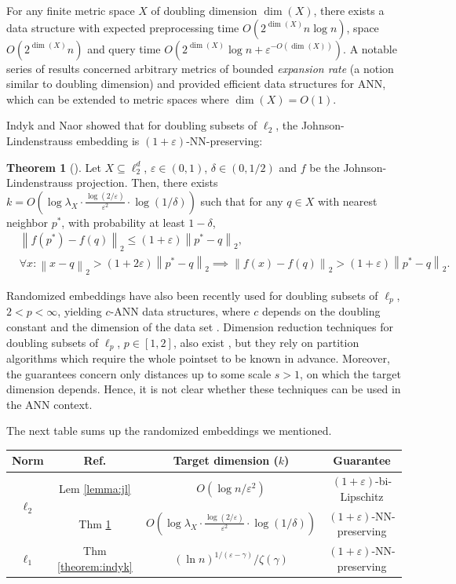 \documentclass[10pt,a4paper,twoside]{book}
\newcommand{\eps}{\varepsilon}
\newcommand{\norm}[1]{\left \rVert {#1} \right \rVert}
\theoremstyle{definition}
\newtheorem{theorem}[definition]{Theorem}
\theoremstyle{remark}
\begin{document}
For any finite metric space $X$ of doubling dimension $\dim(X)$, there exists a data structure \cite{CG06,HM06} with expected preprocessing time $O(2^{\dim(X)} n \log{n})$, space $O(2^{\dim(X)} n)$ and query time $O(2^{\dim(X)}\log{n}+\eps^{-O(\dim(X))})$. A notable series of results \cite{Cla99, KR02, KL04, BKL06} concerned arbitrary metrics of bounded \textit{expansion rate} (a notion similar to doubling dimension) and provided efficient data structures for ANN, which can be extended to metric spaces where $\dim(X)= O(1)$.

Indyk and Naor showed that for doubling subsets of $\ell_2$, the Johnson-Lindenstrauss embedding is $(1+ \eps)$-NN-preserving:
\begin{theorem} [\cite{IN07}] \label{theorem:inaor}
Let $X \subseteq \ell_2^d$, $\eps \in (0, 1)$, $\delta \in (0,1/2)$ and $f$ be the Johnson-Lindenstrauss projection. Then, there exists $k = O\left( \log{\lambda_X} \cdot \frac{\log(2/ \eps)}{\eps^2} \cdot \log(1/ \delta) \right)$
such that for any $q \in X$ with nearest neighbor $p^*$, with probability at least $1-\delta$,
\begin{align*}
    &\norm{f(p^*)-f(q)}_2 \leq (1+ \eps) \norm{p^*-q}_2, \\
    &\forall x: \norm{x-q}_2 > (1+ 2\eps) \norm{p^*-q}_2 \implies \norm{f(x)-f(q)}_2 > (1+ \eps) \norm{p^*-q}_2.
\end{align*}
\end{theorem}

Randomized embeddings have also been recently used for doubling subsets of $\ell_p$, ${2<p<\infty}$, yielding $c$-ANN data structures, where $c$ depends on the doubling constant and the dimension of the data set \cite{BG19}. Dimension reduction techniques for doubling subsets of $\ell_p$, $p\in [1,2]$, also exist \cite{BG16}, but they rely on partition algorithms which require the whole pointset to be known in advance. Moreover, the guarantees concern only distances up to some scale $s>1$, on which the target dimension depends. Hence, it is not clear whether these techniques can be used in the ANN context. 

The next table sums up the randomized embeddings we mentioned.

{ \renewcommand{\arraystretch}{1.5}
\begin{center}
\begin{tabular}{|c|c|c|c|}
\hline
Norm & Ref. & Target dimension ($k$) &  Guarantee  \\
\hline 
\multirow{2}{1em}{$\ell_2$} & Lem \ref{lemma:jl} & $O\left( \log{n} / \eps^2 \right) $ &  $(1+\eps)$-bi-Lipschitz \\
& Thm \ref{theorem:inaor} & $O\left( \log{\lambda_X} \cdot \frac{\log(2/ \eps)}{\eps^2} \cdot \log(1/ \delta) \right)$  &  $(1+\eps)$-NN-preserving  \\
\hline 
$\ell_1$ & Thm \ref{theorem:indyk} & $ \left( \ln{n} \right)^{1/(\eps-\gamma)} / \zeta(\gamma) $ &  $(1+\eps)$-NN-preserving \\
\hline
\end{tabular}
\end{center}
}
\end{document}
